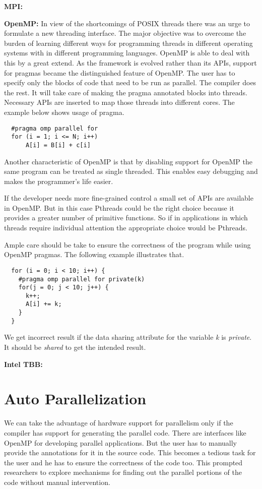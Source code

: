 \textbf{MPI:}

\textbf{OpenMP:} In view of the shortcomings of POSIX threads there was an urge to formulate a new threading
interface. The major objective was to overcome the burden of learning different ways for programming threads in different
operating systems with in different programming languages. OpenMP is able to deal with this
by a great extend. As the framework is evolved rather than its APIs, support for pragmas became the distinguished
feature of OpenMP. The user has to specify only the blocks of code that need to be run
as parallel. The compiler does the rest. It will take care of making the pragma annotated blocks into
threads. Necessary APIs are inserted to map those threads into different cores. The example below
shows usage of pragma.

{\footnotesize
\begin{lstlisting}
  #pragma omp parallel for
  for (i = 1; i <= N; i++)
      A[i] = B[i] + c[i]
\end{lstlisting}
}

Another characteristic of OpenMP is that by disabling support for OpenMP the same program can be treated as
single threaded. This enables easy debugging and makes the programmer's life easier.

If the developer needs more fine-grained control a small set of APIs are available in OpenMP. But in this case Pthreads
could be the right choice because it provides a greater number of primitive functions. So if in applications
in which threads require individual attention the appropriate choice would be Pthreads.

Ample care should be take to ensure the correctness of the program while using OpenMP pragmas. The following
example illustrates that.
{\footnotesize
\begin{lstlisting}
  for (i = 0; i < 10; i++) {
    #pragma omp parallel for private(k)
    for(j = 0; j < 10; j++) {
      k++;
      A[i] += k;
    }
  }
\end{lstlisting}
}

We get incorrect result if the data sharing attribute for the variable \emph{k} is \emph {private}. It should
be \emph{shared} to get the intended result.


\textbf{Intel TBB:}

\section{Auto Parallelization}
We can take the advantage of hardware support for parallelism only if the compiler has
support for generating the parallel code. There are interfaces like OpenMP for
developing parallel applications. But the user has to manually provide the annotations
for it in the source code. This becomes a tedious task for the user and he has to
ensure the correctness of the code too. This prompted researchers to explore
mechanisms for finding out the parallel portions of the code without manual intervention.

